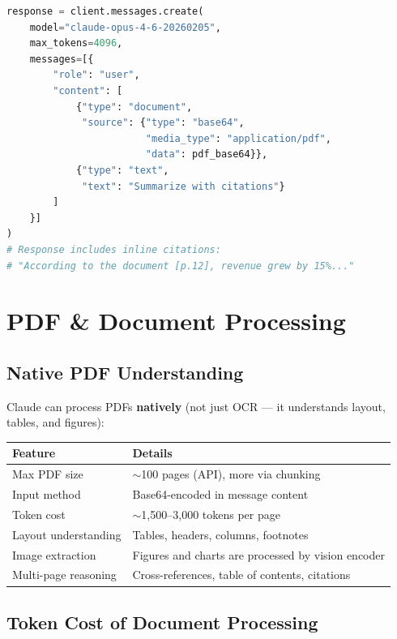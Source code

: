 \documentclass[11pt,a4paper]{article}
\begin{document}
\begin{lstlisting}[language=Python, caption={Citations with Document Upload}]
response = client.messages.create(
    model="claude-opus-4-6-20260205",
    max_tokens=4096,
    messages=[{
        "role": "user",
        "content": [
            {"type": "document",
             "source": {"type": "base64",
                        "media_type": "application/pdf",
                        "data": pdf_base64}},
            {"type": "text",
             "text": "Summarize with citations"}
        ]
    }]
)
# Response includes inline citations:
# "According to the document [p.12], revenue grew by 15%..."
\end{lstlisting}

\section{PDF \& Document Processing}

\subsection{Native PDF Understanding}

Claude can process PDFs \textbf{natively} (not just OCR --- it understands layout, tables, and figures):

\begin{center}
\begin{tabular}{ll}
\toprule
\textbf{Feature} & \textbf{Details} \\
\midrule
Max PDF size & $\sim$100 pages (API), more via chunking \\
Input method & Base64-encoded in message content \\
Token cost & $\sim$1,500--3,000 tokens per page \\
Layout understanding & Tables, headers, columns, footnotes \\
Image extraction & Figures and charts are processed by vision encoder \\
Multi-page reasoning & Cross-references, table of contents, citations \\
\bottomrule
\end{tabular}
\end{center}

\subsection{Token Cost of Document Processing}
\end{document}
